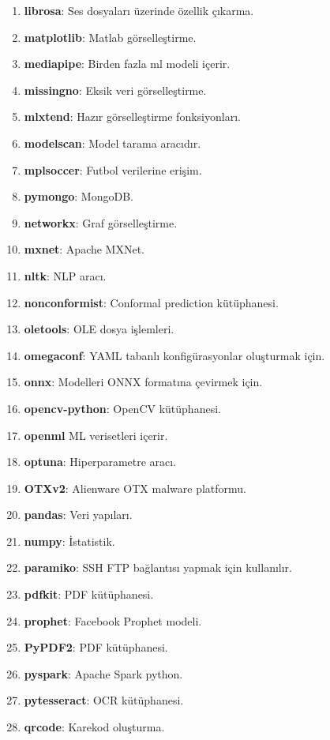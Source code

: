 \begin{enumerate}
    \item \textbf{librosa}: Ses dosyaları üzerinde özellik çıkarma.
    \item \textbf{matplotlib}: Matlab görselleştirme.
    \item \textbf{mediapipe}: Birden fazla ml modeli içerir.
    \item \textbf{missingno}: Eksik veri görselleştirme.
    \item \textbf{mlxtend}: Hazır görselleştirme fonksiyonları.
    \item \textbf{modelscan}: Model tarama aracıdır.
    \item \textbf{mplsoccer}: Futbol verilerine erişim.
    \item \textbf{pymongo}: MongoDB.
    \item \textbf{networkx}: Graf görselleştirme.
    \item \textbf{mxnet}: Apache MXNet.
    \item \textbf{nltk}: NLP aracı.
    \item \textbf{nonconformist}: Conformal prediction kütüphanesi.
    \item \textbf{oletools}: OLE dosya işlemleri.
    \item \textbf{omegaconf}: YAML tabanlı konfigürasyonlar oluşturmak için.
    \item \textbf{onnx}: Modelleri ONNX formatına çevirmek için.
    \item \textbf{opencv-python}: OpenCV kütüphanesi.
    \item \textbf{openml} ML verisetleri içerir.
    \item \textbf{optuna}: Hiperparametre aracı.
    \item \textbf{OTXv2}: Alienware OTX malware platformu.
    \item \textbf{pandas}: Veri yapıları.
    \item \textbf{numpy}: İstatistik.
    \item \textbf{paramiko}: SSH FTP bağlantısı yapmak için kullanılır.
    \item \textbf{pdfkit}: PDF kütüphanesi.
    \item \textbf{prophet}: Facebook Prophet modeli.
    \item \textbf{PyPDF2}: PDF kütüphanesi.
    \item \textbf{pyspark}: Apache Spark python.
    \item \textbf{pytesseract}: OCR kütüphanesi.
    \item \textbf{qrcode}: Karekod oluşturma.

\end{enumerate}
